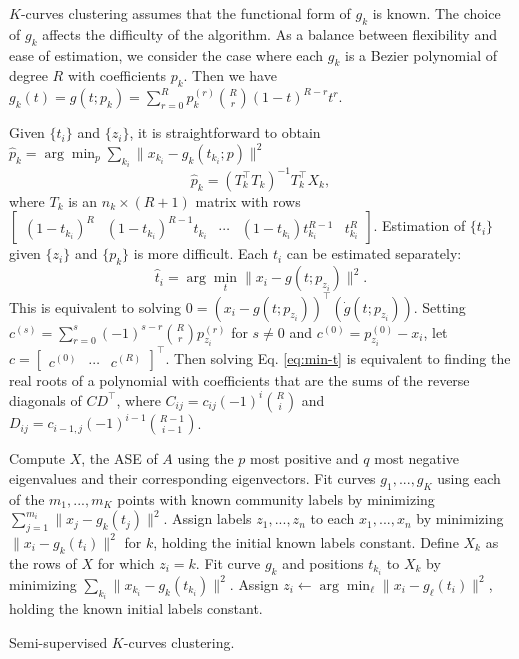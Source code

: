 \documentclass[12pt]{article}
\begin{document}
\(K\)-curves clustering assumes that the functional form of \(g_k\) is
known. The choice of \(g_k\) affects the difficulty of the algorithm. As
a balance between flexibility and ease of estimation, we consider the
case where each \(g_k\) is a Bezier polynomial of degree \(R\) with
coefficients \(p_k\). Then we have
\(g_k(t) = g(t; p_k) = \sum_{r=0}^R p_k^{(r)} \binom{R}{r} (1-t)^{R-r} t^r\).

Given \(\{t_i\}\) and \(\{z_i\}\), it is straightforward to obtain
\(\hat{p}_k = \arg\min_p \sum_{k_i} \|x_{k_i} - g_k (t_{k_i}; p)\|^2\)
\[\hat{p}_k = (T_k^\top T_k)^{-1} T_k^\top X_k,\] where \(T_k\) is an
\(n_k \times (R+1)\) matrix with rows
\(\begin{bmatrix} (1 - t_{k_i})^R & (1 - t_{k_i})^{R-1} t_{k_i} & \cdots & (1 - t_{k_i}) t_{k_i}^{R-1} & t_{k_i}^R \end{bmatrix}\).
Estimation of \(\{t_i\}\) given \(\{z_i\}\) and \(\{p_k\}\) is more
difficult. Each \(t_i\) can be estimated separately:
\begin{equation} \label{eq:min-t}
\hat{t}_i = \arg\min_t \|x_i - g(t; p_{z_i})\|^2. 
\end{equation} This is equivalent to solving
\(0 = (x_i - g(t; p_{z_i}))^\top (\dot{g}(t; p_{z_i}))\). Setting
\(c^{(s)} = \sum_{r=0}^s (-1)^{s-r} \binom{R}{r} p^{(r)}_{z_i}\) for
\(s \neq 0\) and \(c^{(0)} = p^{(0)}_{z_i} - x_i\), let
\(c = \begin{bmatrix} c^{(0)} & \cdots & c^{(R)} \end{bmatrix}^\top\).
Then solving Eq. \ref{eq:min-t} is equivalent to finding the real roots
of a polynomial with coefficients that are the sums of the reverse
diagonals of \(C D^\top\), where \(C_{ij} = c_{ij} (-1)^i \binom{R}{i}\)
and \(D_{ij} = c_{i-1,j} (-1)^{i-1} \binom{R-1}{i-1}\).

\begin{algorithm}[h]
\DontPrintSemicolon
\SetAlgoLined
{}
Compute $X$, the ASE of $A$ using the $p$ most positive and $q$ most negative eigenvalues and their corresponding eigenvectors.\;
Fit curves $g_1, ..., g_K$ using each of the $m_1, ..., m_K$ points with known community labels by minimizing $\sum_{j=1}^{m_i} \|x_j - g_k(t_j)\|^2$.\;
Assign labels $z_1, ..., z_n$ to each $x_1, ..., x_n$ by minimizing $\|x_i - g_k(t_i)\|^2$ for $k$, holding the initial known labels constant.\; 
 {
 {
Define $X_k$ as the rows of $X$ for which $z_i = k$.\;
Fit curve $g_k$ and positions $t_{k_i}$ to $X_k$ by minimizing $\sum_{k_i} \|x_{k_i} - g_k(t_{k_i})\|^2$.\;
}
 {
Assign $z_i \leftarrow \arg\min_\ell \|x_i - g_\ell(t_i)\|^2$, holding the known initial labels constant.\
}
}
\caption{Semi-supervised $K$-curves clustering.}
\end{algorithm}
\end{document}
